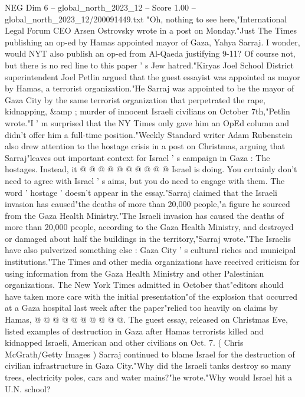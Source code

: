 \begin{textsample}{NEG Dim 6 – global\_north\_2023\_12 – Score 1.00 – global\_north\_2023\_12/200091449.txt}  \label{ex:f6_neg_262}
"Oh, nothing to see here,"International Legal Forum CEO Arsen Ostrovsky wrote in a post on Monday."Just The Times publishing an op-ed by Hamas appointed mayor of Gaza, Yahya Sarraj.
I wonder, would NYT also publish an op-ed from Al-Qaeda justifying 9-11?
Of course not, but there is no red line to this paper ' s Jew hatred."Kiryas Joel School District superintendent Joel Petlin argued that the guest essayist was appointed as mayor by Hamas, a terrorist organization."He Sarraj was appointed to be the mayor of Gaza City by the same terrorist organization that perpetrated the rape, kidnapping, \&amp ; murder of innocent Israeli civilians on October 7th,"Petlin wrote."I ' m surprised that the NY Times only gave him an OpEd column and didn't offer him a full-time position."Weekly Standard writer Adam Rubenstein also drew attention to the hostage crisis in a post on Christmas, arguing that Sarraj"leaves out important context for Israel ' s campaign in Gaza : The hostages.
Instead, it @ @ @ @ @ @ @ @ @ @ Israel is doing.
You certainly don't need to agree with Israel ' s aims, but you do need to engage with them.
The word ' hostage ' doesn't appear in the essay."Sarraj claimed that the Israeli invasion has caused"the deaths of more than 20,000 people,"a figure he sourced from the Gaza Health Ministry."The Israeli invasion has caused the deaths of more than 20,000 people, according to the Gaza Health Ministry, and destroyed or damaged about half the buildings in the territory,"Sarraj wrote."The Israelis have also pulverized something else : Gaza City ' s cultural riches and municipal institutions."The Times and other media organizations have received criticism for using information from the Gaza Health Ministry and other Palestinian organizations.
The New York Times admitted in October that"editors should have taken more care with the initial presentation"of the explosion that occurred at a Gaza hospital last week after the paper"relied too heavily on claims by Hamas, @ @ @ @ @ @ @ @ @ @.
The guest essay, released on Christmas Eve, listed examples of destruction in Gaza after Hamas terrorists killed and kidnapped Israeli, American and other civilians on Oct. 7. ( Chris McGrath/Getty Images ) Sarraj continued to blame Israel for the destruction of civilian infrastructure in Gaza City."Why did the Israeli tanks destroy so many trees, electricity poles, cars and water mains?"he wrote."Why would Israel hit a U.N. school?

\end{textsample}
